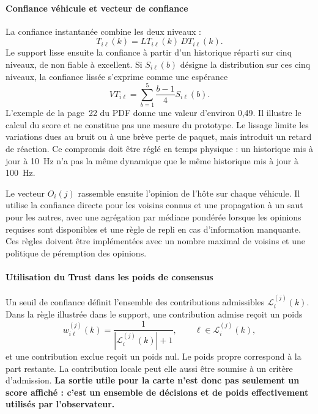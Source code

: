 \documentclass[11pt,a4paper]{article}
\renewcommand{\strong}[1]{\textbf{#1}}
\begin{document}
\paragraph{Confiance véhicule et vecteur de confiance}
La confiance instantanée combine les deux niveaux :
\begin{equation}
T_{i\ell}(k)=LT_{i\ell}(k)\,DT_{i\ell}(k).
\end{equation}
Le support lisse ensuite la confiance à partir d'un historique réparti sur cinq niveaux, de non fiable à excellent. Si $S_{i\ell}(b)$ désigne la distribution sur ces cinq niveaux, la confiance lissée s'exprime comme une espérance
\begin{equation}
VT_{i\ell}=\sum_{b=1}^{5}\frac{b-1}{4}S_{i\ell}(b).
\end{equation}
L'exemple de la page~22 du PDF donne une valeur d'environ 0,49. Il illustre le calcul du score et ne constitue pas une mesure du prototype. Le lissage limite les variations dues au bruit ou à une brève perte de paquet, mais introduit un retard de réaction. Ce compromis doit être réglé en temps physique : un historique mis à jour à 10~Hz n'a pas la même dynamique que le même historique mis à jour à 100~Hz.

Le vecteur $O_i(j)$ rassemble ensuite l'opinion de l'hôte sur chaque véhicule. Il utilise la confiance directe pour les voisins connus et une propagation à un saut pour les autres, avec une agrégation par médiane pondérée lorsque les opinions requises sont disponibles et une règle de repli en cas d'information manquante. Ces règles doivent être implémentées avec un nombre maximal de voisins et une politique de péremption des opinions.

\paragraph{Utilisation du Trust dans les poids de consensus}
Un seuil de confiance définit l'ensemble des contributions admissibles $\mathcal{L}_i^{(j)}(k)$. Dans la règle illustrée dans le support, une contribution admise reçoit un poids
\begin{equation}
w_{i\ell}^{(j)}(k)=\frac{1}{|\mathcal{L}_i^{(j)}(k)|+1},
\qquad \ell\in\mathcal{L}_i^{(j)}(k),
\end{equation}
et une contribution exclue reçoit un poids nul. Le poids propre correspond à la part restante. La contribution locale peut elle aussi être soumise à un critère d'admission. \strong{La sortie utile pour la carte n'est donc pas seulement un score affiché : c'est un ensemble de décisions et de poids effectivement utilisés par l'observateur.}
\end{document}
